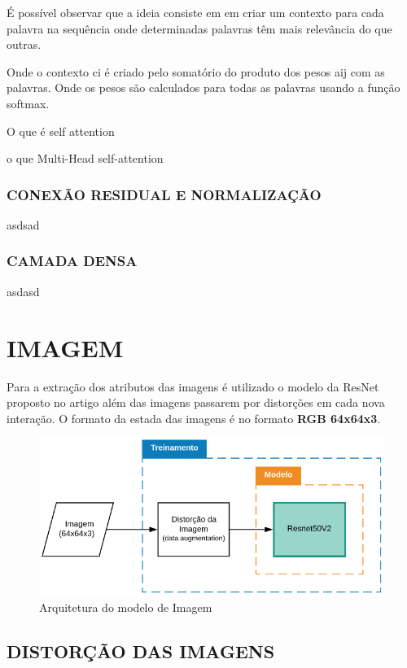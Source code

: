 É possível observar que a ideia consiste em em criar um contexto para cada palavra na sequência onde determinadas palavras têm mais relevância do que outras.

Onde o contexto ci é criado pelo somatório do produto dos pesos aij com as palavras. Onde os pesos são calculados para todas as palavras usando a função softmax.

O que é self attention

o que Multi-Head self-attention


\subsubsection{CONEXÃO RESIDUAL E NORMALIZAÇÃO}
asdsad

\subsubsection{CAMADA DENSA}
asdasd


\section{IMAGEM}

Para a extração dos atributos das imagens é utilizado o modelo da ResNet proposto no artigo \cite{resnet} além das imagens passarem por distorções em cada nova interação. O formato da estada das imagens é no formato \textbf{RGB 64x64x3}.

\begin{figure}[]
	\caption{\label{modelo_imagem_macro} Arquitetura do modelo de Imagem}
	\begin{center}
	    \includegraphics[scale=0.5]{artigo/recursos/imagens/modelo_imagem_macro.png}
	\end{center}
\end{figure}


\subsection{DISTORÇÃO DAS IMAGENS}

